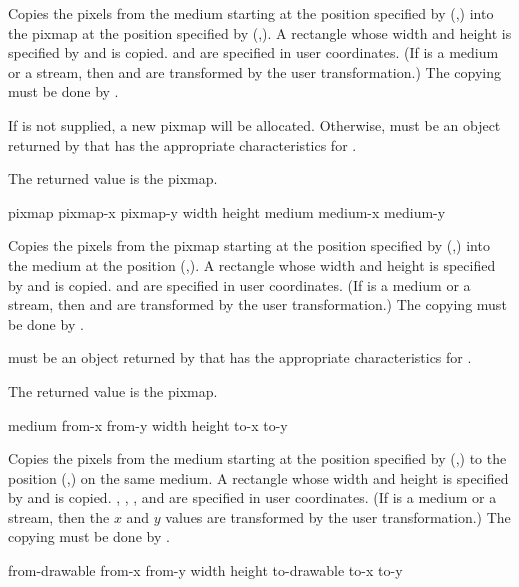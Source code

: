 Copies the pixels from the medium  starting at the position specified
by (,) into the pixmap  at the position
specified by (,).  A rectangle whose width and
height is specified by  and  is copied.  
and  are specified in user coordinates.  (If  is a
medium or a stream, then  and  are transformed by the
user transformation.)  The copying must be done by .

If  is not supplied, a new pixmap will be allocated.  Otherwise,
 must be an object returned by  that has the
appropriate characteristics for .

The returned value is the pixmap.

 {pixmap pixmap-x pixmap-y width height
                           medium medium-x medium-y}

Copies the pixels from the pixmap  starting at the position
specified by (,) into the medium  at the
position (,).  A rectangle whose width and height is
specified by  and  is copied.   and
 are specified in user coordinates.  (If  is a medium or
a stream, then  and  are transformed by the user
transformation.)  The copying must be done by .

 must be an object returned by  that has the
appropriate characteristics for .

The returned value is the pixmap.

 {medium from-x from-y width height to-x to-y}

Copies the pixels from the medium  starting at the position
specified by (,) to the position (,)
on the same medium.  A rectangle whose width and height is specified by
 and  is copied.  , , ,
and  are specified in user coordinates.  (If  is a medium
or a stream, then the $x$ and $y$ values are transformed by the user
transformation.)  The copying must be done by .


 {from-drawable from-x from-y width height
                                to-drawable to-x to-y}

